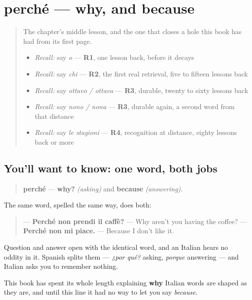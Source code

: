 \section[perché]{perché — why, and because}

\label{lesson:IT-C32-perche}



\begin{quote}
The chapter's middle lesson, and the one that closes a hole this book has had from its first page.

\begin{itemize}
\raggedright
  \item \emph{Recall:} say \emph{o} — \textbf{R1}, one lesson back, before it decays
  \item \emph{Recall:} say \emph{chi} — \textbf{R2}, the first real retrieval, five to fifteen lessons back
  \item \emph{Recall:} say \emph{ottavo / ottava} — \textbf{R3}, durable, twenty to sixty lessons back
  \item \emph{Recall:} say \emph{nono / nona} — \textbf{R3}, durable again, a second word from that distance
  \item \emph{Recall:} say \emph{le stagioni} — \textbf{R4}, recognition at distance, eighty lessons back or more
\end{itemize}
\end{quote}

\subsection*{You'll want to know: one word, both jobs}
\begin{quote}
\textbf{perché} — \textbf{why?} \emph{(asking)} and \textbf{because} \emph{(answering)}.
\end{quote}

The same word, spelled the same way, does both:

\begin{quote}
— \textbf{Perché non prendi il caffè?} — Why aren't you having the coffee? — \textbf{Perché non mi piace.} — Because I don't like it.
\end{quote}

Question and answer open with the identical word, and an Italian hears no oddity in it. Spanish splits them — \emph{¿por qué?} asking, \emph{porque} answering — and Italian asks you to remember nothing.

This book has spent its whole length explaining \textbf{why} Italian words are shaped as they are, and until this line it had no way to let you say \emph{because}.

